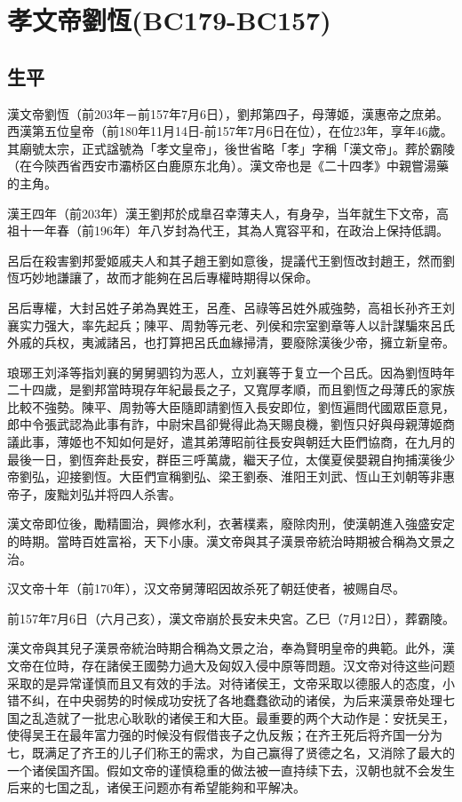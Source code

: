 
\section{孝文帝劉恆\tiny(BC179-BC157)}

\subsection{生平}

漢文帝劉恆（前203年－前157年7月6日），劉邦第四子，母薄姬，漢惠帝之庶弟。西漢第五位皇帝（前180年11月14日-前157年7月6日在位），在位23年，享年46歲。其廟號太宗，正式諡號為「孝文皇帝」，後世省略「孝」字稱「漢文帝」。葬於霸陵（在今陝西省西安市灞桥区白鹿原东北角）。漢文帝也是《二十四孝》中親嘗湯藥的主角。

漢王四年（前203年）漢王劉邦於成臯召幸薄夫人，有身孕，当年就生下文帝，高祖十一年春（前196年）年八岁封為代王，其為人寬容平和，在政治上保持低調。

呂后在殺害劉邦愛姬戚夫人和其子趙王劉如意後，提議代王劉恆改封趙王，然而劉恆巧妙地謙讓了，故而才能夠在呂后專權時期得以保命。

呂后專權，大封呂姓子弟為異姓王，呂產、呂祿等呂姓外戚強勢，高祖长孙齐王刘襄实力强大，率先起兵；陳平、周勃等元老、列侯和宗室劉章等人以計謀騙來呂氏外戚的兵权，夷滅諸呂，也打算把呂氏血緣掃清，要廢除漢後少帝，擁立新皇帝。

琅琊王刘泽等指刘襄的舅舅驷钧为恶人，立刘襄等于复立一个吕氏。因為劉恆時年二十四歲，是劉邦當時現存年紀最長之子，又寬厚孝順，而且劉恆之母薄氏的家族比較不強勢。陳平、周勃等大臣隨即請劉恆入長安即位，劉恆遍問代國眾臣意見，郎中令張武認為此事有詐，中尉宋昌卻覺得此為天賜良機，劉恆只好與母親薄姬商議此事，薄姬也不知如何是好，遣其弟薄昭前往長安與朝廷大臣們協商，在九月的最後一日，劉恆奔赴長安，群臣三呼萬歲，繼天子位，太僕夏侯嬰親自拘捕漢後少帝劉弘，迎接劉恆。大臣們宣稱劉弘、梁王劉泰、淮阳王刘武、恆山王刘朝等非惠帝子，废黜刘弘并将四人杀害。

漢文帝即位後，勵精圖治，興修水利，衣著樸素，廢除肉刑，使漢朝進入強盛安定的時期。當時百姓富裕，天下小康。漢文帝與其子漢景帝統治時期被合稱為文景之治。

汉文帝十年（前170年），汉文帝舅薄昭因故杀死了朝廷使者，被赐自尽。

前157年7月6日（六月己亥），漢文帝崩於長安未央宮。乙巳（7月12日），葬霸陵。

漢文帝與其兒子漢景帝統治時期合稱為文景之治，奉為賢明皇帝的典範。此外，漢文帝在位時，存在諸侯王國勢力過大及匈奴入侵中原等問題。汉文帝对待这些问题采取的是异常谨慎而且又有效的手法。对待诸侯王，文帝采取以德服人的态度，小错不纠，在中央弱势的时候成功安抚了各地蠢蠢欲动的诸侯，为后来漢景帝处理七国之乱造就了一批忠心耿耿的诸侯王和大臣。最重要的两个大动作是：安抚吴王，使得吴王在最年富力强的时候没有假借丧子之仇反叛；在齐王死后将齐国一分为七，既满足了齐王的儿子们称王的需求，为自己赢得了贤德之名，又消除了最大的一个诸侯国齐国。假如文帝的谨慎稳重的做法被一直持续下去，汉朝也就不会发生后来的七国之乱，诸侯王问题亦有希望能夠和平解决。

